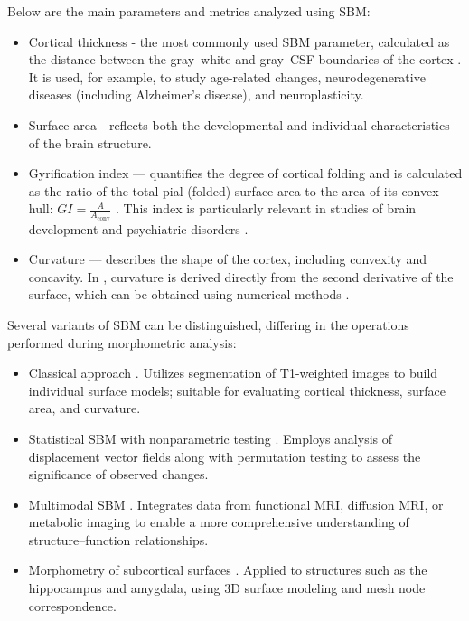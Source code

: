 \documentclass[default]{subfiles}
\begin{document}
Below are the main parameters and metrics analyzed using SBM:\newline

\begin{itemize}
    \item Cortical thickness - the most commonly used SBM parameter, calculated as the distance between the gray–white
    and gray–CSF boundaries of the cortex \cite{evans_2015}. It is used, for example, to study age-related changes,
    neurodegenerative diseases (including Alzheimer’s disease), and neuroplasticity.
    
    \item Surface area - reflects both the developmental and individual characteristics of the brain structure.
    
    \item Gyrification index \cite{madeira_2020} — quantifies the degree of cortical folding and is calculated as the
    ratio of the total pial (folded) surface area to the area of its convex hull: $GI = \frac{A}{A_{\text{conv}}}$
    \cite{zilles_1988}. This index is particularly relevant in studies of brain development and psychiatric disorders
    \cite{goto_2022}.
    
    \item Curvature — describes the shape of the cortex, including convexity and concavity. In \cite{fischl_2000},
    curvature is derived directly from the second derivative of the surface, which can be obtained using numerical
    methods \cite{meyer_2003}.\newline
\end{itemize}

Several variants of SBM can be distinguished, differing in the operations performed during morphometric
analysis:\newline
\begin{itemize}
    \item Classical approach \cite{fischl_2012}. Utilizes segmentation of T1-weighted images to build individual
    surface models; suitable for evaluating cortical thickness, surface area, and curvature.

    \item Statistical SBM with nonparametric testing \cite{pantazis_2004}. Employs analysis of displacement vector
    fields along with permutation testing to assess the significance of observed changes.

    \item Multimodal SBM \cite{goto_2022}. Integrates data from functional MRI, diffusion MRI, or metabolic imaging to
    enable a more comprehensive understanding of structure–function relationships.

    \item Morphometry of subcortical surfaces \cite{devanand_2012}. Applied to structures such as the hippocampus and
    amygdala, using 3D surface modeling and mesh node correspondence.\newline
\end{itemize}
\end{document}
